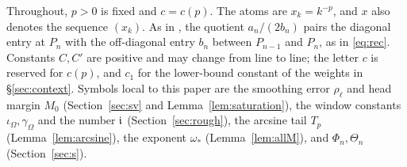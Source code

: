 Throughout, $p>0$ is fixed and $c=c(p)$. The atoms are $x_k=k^{-p}$, and $x$ also denotes the sequence $(x_k)$. As in
\cite{PaperII}, the quotient $a_n/(2b_n)$ pairs the diagonal entry at $P_n$ with the off-diagonal entry $b_n$ between
$P_{n-1}$ and $P_n$, as in \eqref{eq:rec}.
Constants $C,C'$ are positive and may change from line to line; the letter $c$ is reserved for $c(p)$, and $c_1$
for the lower-bound constant of the weights in \S\ref{sec:context}. Symbols local to this paper are the smoothing error
$\rho_\ell$ and head margin $M_0$ (Section~\ref{sec:sv} and Lemma~\ref{lem:saturation}), the window constants
$\iota_\Omega,\gamma_\Omega$ and the number $\mathfrak{i}$ (Section~\ref{sec:rough}), the arcsine tail $T_p$ (Lemma~\ref{lem:arcsine}), the exponent $\omega_*$ (Lemma~\ref{lem:allM}),
and $\Phi_n,\Theta_n$ (Section~\ref{sec:s}).
